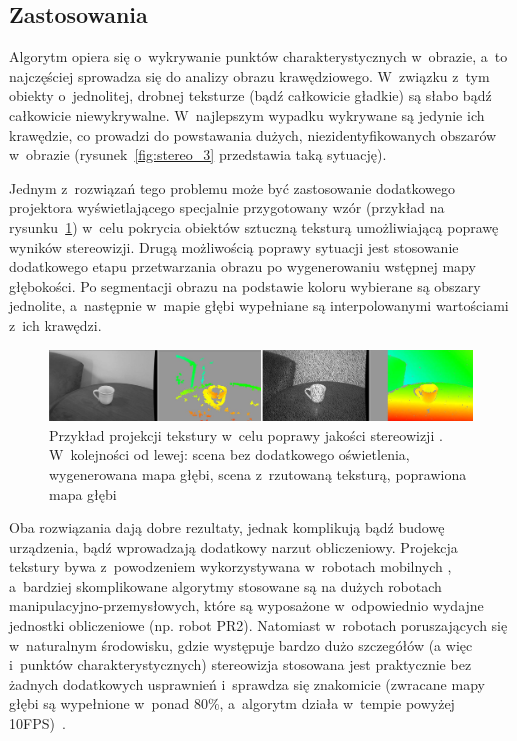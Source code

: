 \subsection{Zastosowania}

Algorytm opiera się o~wykrywanie punktów charakterystycznych w~obrazie, a~to
najczęściej sprowadza się do analizy obrazu krawędziowego. W~związku z~tym
obiekty o~jednolitej, drobnej teksturze (bądź całkowicie gładkie) są słabo bądź
całkowicie niewykrywalne. W~najlepszym wypadku wykrywane są jedynie ich
krawędzie, co prowadzi do powstawania dużych, niezidentyfikowanych obszarów 
w~obrazie (rysunek~\ref{fig:stereo_3} przedstawia taką sytuację).

Jednym z~rozwiązań tego problemu może być zastosowanie dodatkowego projektora
wyświetlającego specjalnie przygotowany wzór (przykład na
rysunku~\ref{fig:stereo_texture}) w~celu pokrycia obiektów sztuczną teksturą
umożliwiającą poprawę wyników stereowizji. Drugą możliwością poprawy sytuacji
jest stosowanie dodatkowego etapu przetwarzania obrazu po wygenerowaniu
wstępnej mapy głębokości. Po segmentacji obrazu na podstawie koloru wybierane
są obszary jednolite, a~następnie w~mapie głębi wypełniane są interpolowanymi
wartościami z~ich krawędzi.

\begin{figure}[htpb!]
\centering
\includegraphics[width=16cm]{../../Common/img/stereo_texture}
\caption[Przykład projekcji tekstury w~celu poprawy jakości
stereowizji]{Przykład projekcji tekstury w~celu poprawy jakości stereowizji
\cite{konolige-icra-2010-a}. W~kolejności od lewej: scena bez dodatkowego
oświetlenia, wygenerowana mapa głębi, scena z~rzutowaną teksturą, poprawiona
mapa głębi}
\label{fig:stereo_texture}
\end{figure}

Oba rozwiązania dają dobre rezultaty, jednak komplikują bądź budowę urządzenia,
bądź wprowadzają dodatkowy narzut obliczeniowy. Projekcja tekstury bywa
z~powodzeniem wykorzystywana w~robotach mobilnych \cite{piorkowski2008}, 
a~bardziej skomplikowane algorytmy stosowane są na dużych robotach
manipulacyjno-przemysłowych, które są wyposażone w~odpowiednio wydajne
jednostki obliczeniowe (np. robot PR2). Natomiast w~robotach poruszających się
w~naturalnym środowisku, gdzie występuje bardzo dużo szczegółów (a więc 
i~punktów charakterystycznych) stereowizja stosowana jest praktycznie bez żadnych
dodatkowych usprawnień i~sprawdza się znakomicie (zwracane mapy głębi są
wypełnione w~ponad 80\%, a~algorytm działa w~tempie powyżej 10FPS)~\cite{outdoor-stereo}.


